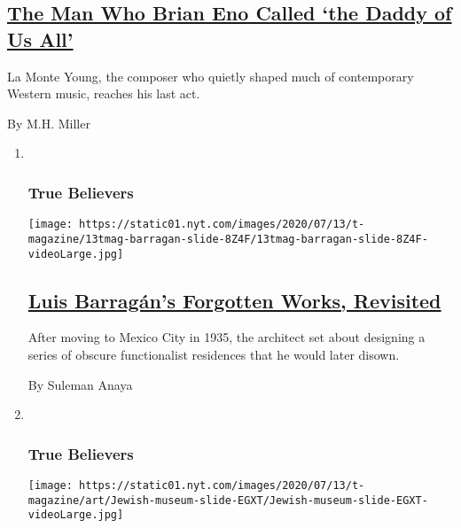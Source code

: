 \begin{enumerate}
  \hypertarget{the-man-who-brian-eno-called-the-daddy-of-us-all}{%
  \subsection{\texorpdfstring{\href{/2020/07/22/t-magazine/la-monte-young.html}{The
  Man Who Brian Eno Called `the Daddy of Us
  All'}}{The Man Who Brian Eno Called `the Daddy of Us All'}}\label{the-man-who-brian-eno-called-the-daddy-of-us-all}}

  La Monte Young, the composer who quietly shaped much of contemporary
  Western music, reaches his last act.

  By M.H. Miller
\end{enumerate}

\begin{enumerate}
\def\labelenumi{\arabic{enumi}.}
\item ~
  \hypertarget{true-believers-4}{%
  \subsubsection{True Believers}\label{true-believers-4}}

  \texttt{[image: https://static01.nyt.com/images/2020/07/13/t-magazine/13tmag-barragan-slide-8Z4F/13tmag-barragan-slide-8Z4F-videoLarge.jpg]}

  \hypertarget{luis-barraguxe1ns-forgotten-works-revisited}{%
  \subsection{\texorpdfstring{\href{/2020/07/24/t-magazine/luis-barragan.html}{Luis
  Barragán's Forgotten Works,
  Revisited}}{Luis Barragán's Forgotten Works, Revisited}}\label{luis-barraguxe1ns-forgotten-works-revisited}}

  After moving to Mexico City in 1935, the architect set about designing
  a series of obscure functionalist residences that he would later
  disown.

  By Suleman Anaya
\item ~
  \hypertarget{true-believers-5}{%
  \subsubsection{True Believers}\label{true-believers-5}}

  \texttt{[image: https://static01.nyt.com/images/2020/07/13/t-magazine/art/Jewish-museum-slide-EGXT/Jewish-museum-slide-EGXT-videoLarge.jpg]}


\end{enumerate}
